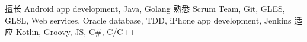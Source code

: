 
\begin{cvskills}
	\cvskill
		{擅长}
		{Android app development, Java, Golang}
	\cvskill
		{熟悉}
		{Scrum Team, Git, GLES, GLSL, Web services, Oracle database, TDD, iPhone app development, Jenkins}
	\cvskill
		{适应}
		{Kotlin, Groovy, JS, C\#, C/C++}
\end{cvskills}

